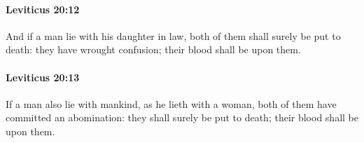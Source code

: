 		\paragraph{Leviticus 20:12} %
			\label{LEVITICUS-20-12}

			And if a man lie with his daughter in law, both of them shall surely be put to death: they have wrought confusion; their blood shall be upon them.


		\paragraph{Leviticus 20:13} %
			\label{LEVITICUS-20-13}

			If a man also lie with mankind, as he lieth with a woman, both of them have committed an abomination: they shall surely be put to death; their blood shall be upon them.


